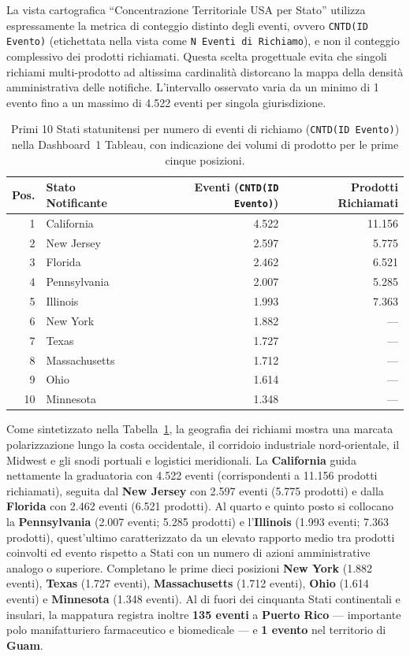 La vista cartografica ``Concentrazione Territoriale USA per Stato'' utilizza espressamente la metrica di conteggio distinto degli eventi, ovvero \texttt{CNTD(ID Evento)} (etichettata nella vista come \texttt{N\textdegree{} Eventi di Richiamo}), e non il conteggio complessivo dei prodotti richiamati. Questa scelta progettuale evita che singoli richiami multi-prodotto ad altissima cardinalità distorcano la mappa della densità amministrativa delle notifiche. L'intervallo osservato varia da un minimo di 1 evento fino a un massimo di 4.522 eventi per singola giurisdizione.

\begin{table}[htbp]
\centering
\caption{Primi 10 Stati statunitensi per numero di eventi di richiamo (\texttt{CNTD(ID Evento)}) nella Dashboard~1 Tableau, con indicazione dei volumi di prodotto per le prime cinque posizioni.}
\label{tab:tableau_top_states}
\begin{tabularx}{\textwidth}{@{}rXrr@{}}
\toprule
\textbf{Pos.} & \textbf{Stato Notificante} & \textbf{Eventi (\texttt{CNTD(ID Evento)})} & \textbf{Prodotti Richiamati} \\
\midrule
1 & California & 4.522 & 11.156 \\
2 & New Jersey & 2.597 & 5.775 \\
3 & Florida & 2.462 & 6.521 \\
4 & Pennsylvania & 2.007 & 5.285 \\
5 & Illinois & 1.993 & 7.363 \\
6 & New York & 1.882 & --- \\
7 & Texas & 1.727 & --- \\
8 & Massachusetts & 1.712 & --- \\
9 & Ohio & 1.614 & --- \\
10 & Minnesota & 1.348 & --- \\
\bottomrule
\end{tabularx}
\end{table}

Come sintetizzato nella Tabella~\ref{tab:tableau_top_states}, la geografia dei richiami mostra una marcata polarizzazione lungo la costa occidentale, il corridoio industriale nord-orientale, il Midwest e gli snodi portuali e logistici meridionali. La \textbf{California} guida nettamente la graduatoria con 4.522 eventi (corrispondenti a 11.156 prodotti richiamati), seguita dal \textbf{New Jersey} con 2.597 eventi (5.775 prodotti) e dalla \textbf{Florida} con 2.462 eventi (6.521 prodotti). Al quarto e quinto posto si collocano la \textbf{Pennsylvania} (2.007 eventi; 5.285 prodotti) e l'\textbf{Illinois} (1.993 eventi; 7.363 prodotti), quest'ultimo caratterizzato da un elevato rapporto medio tra prodotti coinvolti ed evento rispetto a Stati con un numero di azioni amministrative analogo o superiore. Completano le prime dieci posizioni \textbf{New York} (1.882 eventi), \textbf{Texas} (1.727 eventi), \textbf{Massachusetts} (1.712 eventi), \textbf{Ohio} (1.614 eventi) e \textbf{Minnesota} (1.348 eventi). Al di fuori dei cinquanta Stati continentali e insulari, la mappatura registra inoltre \textbf{135 eventi} a \textbf{Puerto Rico} --- importante polo manifatturiero farmaceutico e biomedicale --- e \textbf{1 evento} nel territorio di \textbf{Guam}.

